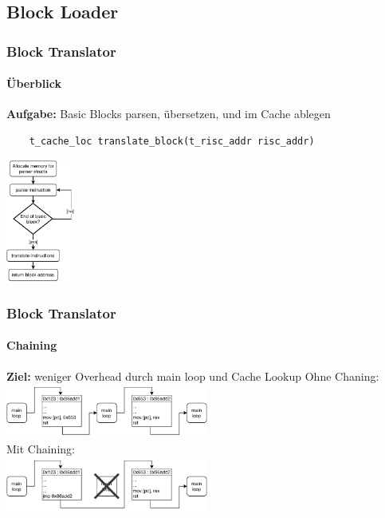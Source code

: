 \documentclass[german]{tum-presentation}
\begin{document}
\subsection{Block Loader} %
\begin{frame}[fragile]
	\frametitle{Block Translator}
	\framesubtitle{Überblick}
	\textbf{Aufgabe:}    Basic Blocks parsen, übersetzen, und im Cache ablegen
	\begin{lstlisting}
	t_cache_loc translate_block(t_risc_addr risc_addr)
	\end{lstlisting}
	\pause
	\includegraphics[width=0.17\textwidth]{diagrams/blocktranslate}
\end{frame}

\begin{frame}[fragile]
	\frametitle{Block Translator}
	\framesubtitle{Chaining}
	\textbf{Ziel:} weniger Overhead durch main loop und Cache Lookup
	\pause
	Ohne Chaning:
	\includegraphics[width=0.5\textwidth]{diagrams/unchained}\\
	\pause
	Mit Chaining:\\
	\includegraphics[width=0.5\textwidth]{diagrams/chained}
\end{frame}
\end{document}
